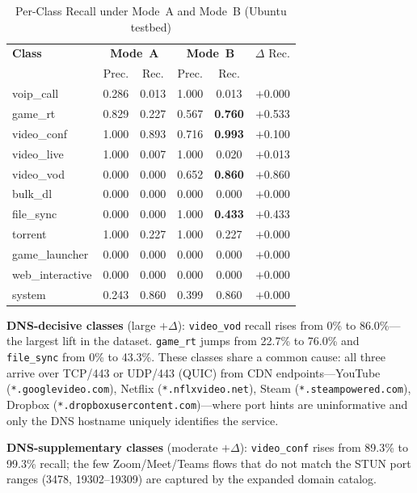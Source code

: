 \documentclass[conference]{IEEEtran}
\begin{document}
\begin{table}[t]
\caption{Per-Class Recall under Mode~A and Mode~B (Ubuntu testbed)}
\label{tab:perclass}
\centering
\scriptsize
{\setlength{\tabcolsep}{3pt}
\begin{tabular}{l|cc|cc|c}
\toprule
\textbf{Class} & \multicolumn{2}{c|}{\textbf{Mode~A}} & \multicolumn{2}{c|}{\textbf{Mode~B}} & $\Delta$ Rec. \\
 & Prec. & Rec. & Prec. & Rec. & \\
\midrule
voip\_call        & 0.286 & 0.013 & 1.000 & 0.013 & $+$0.000 \\
game\_rt          & 0.829 & 0.227 & 0.567 & \textbf{0.760} & $+$0.533 \\
video\_conf       & 1.000 & 0.893 & 0.716 & \textbf{0.993} & $+$0.100 \\
video\_live       & 1.000 & 0.007 & 1.000 & 0.020 & $+$0.013 \\
video\_vod        & 0.000 & 0.000 & 0.652 & \textbf{0.860} & $+$0.860 \\
bulk\_dl          & 0.000 & 0.000 & 0.000 & 0.000 & $+$0.000 \\
file\_sync        & 0.000 & 0.000 & 1.000 & \textbf{0.433} & $+$0.433 \\
torrent           & 1.000 & 0.227 & 1.000 & 0.227 & $+$0.000 \\
game\_launcher    & 0.000 & 0.000 & 0.000 & 0.000 & $+$0.000 \\
web\_interactive  & 0.000 & 0.000 & 0.000 & 0.000 & $+$0.000 \\
system            & 0.243 & 0.860 & 0.399 & 0.860 & $+$0.000 \\
\bottomrule
\end{tabular}}
\end{table}

\textbf{DNS-decisive classes} (large $+\Delta$):
\texttt{video\_vod} recall rises from 0\% to 86.0\%---the largest lift
in the dataset.
\texttt{game\_rt} jumps from 22.7\% to 76.0\% and \texttt{file\_sync}
from 0\% to 43.3\%.
These classes share a common cause: all three arrive over TCP/443 or
UDP/443 (QUIC) from CDN endpoints---YouTube (\texttt{*.googlevideo.com}),
Netflix (\texttt{*.nflxvideo.net}), Steam (\texttt{*.steampowered.com}),
Dropbox (\texttt{*.dropboxusercontent.com})---where port hints are
uninformative and only the DNS hostname uniquely identifies the service.

\textbf{DNS-supplementary classes} (moderate $+\Delta$):
\texttt{video\_conf} rises from 89.3\% to 99.3\% recall; the few
Zoom/Meet/Teams flows that do not match the STUN port ranges (3478,
19302--19309) are captured by the expanded domain catalog.
\end{document}
